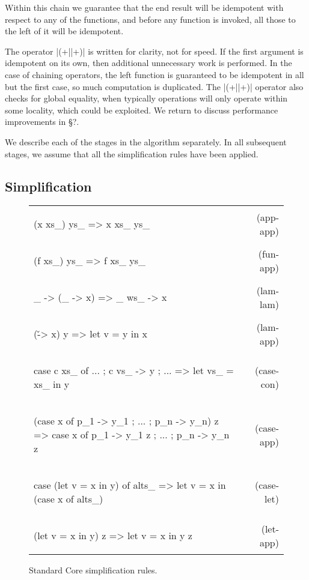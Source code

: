 \documentclass[preprint]{sigplanconf}
\newcommand{\simp}[2]{\vspace{-7mm} #2 & (#1) \\}
\newenvironment{simplify}
    {\noindent
     \begin{flushright}
     \begin{tabular}{p{6.5cm}r}
    }
    {\end{tabular}
     \vspace{-7mm}
     \end{flushright}
    }
\begin{document}
Within this chain we guarantee that the end result will be idempotent with respect to any of the functions, and before any function is invoked, all those to the left of it will be idempotent.

The operator |(+||+)| is written for clarity, not for speed. If the first argument is idempotent on its own, then additional unnecessary work is performed. In the case of chaining operators, the left function is guaranteed to be idempotent in all but the first case, so much computation is duplicated. The |(+||+)| operator also checks for global equality, when typically operations will only operate within some locality, which could be exploited. We return to discuss performance improvements in \S?.

We describe each of the stages in the algorithm separately. In all subsequent stages, we assume that all the simplification rules have been applied.


\subsection{Simplification}

\begin{figure}
\begin{simplify}

\simp{app-app}{
\begin{code}
(x xs_) ys_
    => x xs_ ys_
\end{code}}

\simp{fun-app}{
\begin{code}
(f xs_) ys_
    => f xs_ ys_
\end{code}}

\simp{lam-lam}{
\begin{code}
\vs_ -> (\ws_ -> x)
    => \vs_ ws_ -> x
\end{code}}

\simp{lam-app}{
\begin{code}
(\v -> x) y
    => let v = y in x
\end{code}}

\simp{case-con}{
\begin{code}
case c xs_ of {... ; c vs_ -> y ; ...}
    => let vs_ = xs_ in y
\end{code}}

\simp{case-app}{
\begin{code}
(case x of {p_1 -> y_1 ; ... ; p_n -> y_n}) z
    => case x of {p_1 -> y_1 z ; ... ; p_n -> y_n z}
\end{code}}

\simp{case-let}{
\begin{code}
case (let v = x in y) of alts_
    => let v = x in (case x of alts_)
\end{code}}

\simp{let-app}{
\begin{code}
(let v = x in y) z
    => let v = x in y z
\end{code}}

\end{simplify}
\caption{Standard Core simplification rules.}
\label{fig:simplify}
\end{figure}
\end{document}
